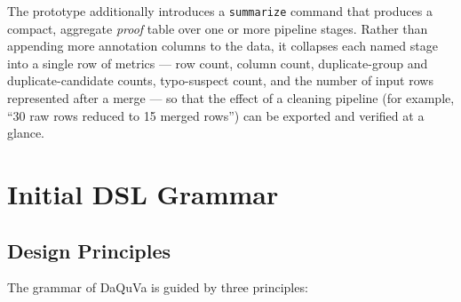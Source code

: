 The prototype additionally introduces a \texttt{summarize} command that
produces a compact, aggregate \emph{proof} table over one or more pipeline
stages. Rather than appending more annotation columns to the data, it collapses
each named stage into a single row of metrics --- row count, column count,
duplicate-group and duplicate-candidate counts, typo-suspect count, and the
number of input rows represented after a merge --- so that the effect of a
cleaning pipeline (for example, ``30 raw rows reduced to 15 merged rows'') can
be exported and verified at a glance.


\section{Initial DSL Grammar}
\label{sec:grammar}

\subsection{Design Principles}

The grammar of DaQuVa is guided by three principles:

